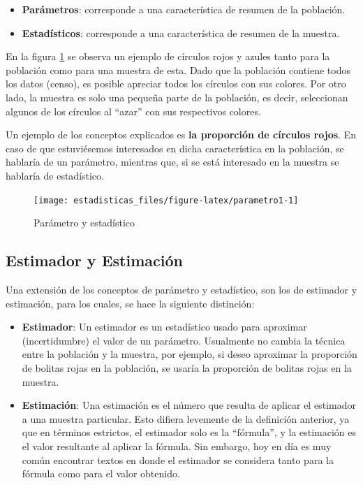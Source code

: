 \documentclass[
  11pt,
]{book}
\providecommand{\tightlist}{%
  \setlength{\itemsep}{0pt}\setlength{\parskip}{0pt}}
\theoremstyle{definition}
\theoremstyle{definition}
\theoremstyle{definition}
\theoremstyle{definition}
\theoremstyle{remark}
\begin{document}
\begin{itemize}
\tightlist
\item
  \textbf{Parámetros}: corresponde a una característica de resumen de la población.
\item
  \textbf{Estadísticos}: corresponde a una característica de resumen de la muestra.
\end{itemize}

En la figura \ref{fig:parametro1} se observa un ejemplo de círculos rojos y azules tanto para la población como para una muestra de esta. Dado que la población contiene todos los datos (censo), es posible apreciar todos los círculos con sus colores. Por otro lado, la muestra es solo una pequeña parte de la población, es decir, seleccionan algunos de los círculos al ``azar'' con sus respectivos colores.

Un ejemplo de los conceptos explicados es \textbf{la proporción de círculos rojos}. En caso de que estuviésemos interesados en dicha característica en la población, se hablaría de un parámetro, mientras que, si se está interesado en la muestra se hablaría de estadístico.

\begin{figure}

{\centering \texttt{[image: estadisticas\_files/figure-latex/parametro1-1]} 

}

\caption{Parámetro y estadístico}\label{fig:parametro1}
\end{figure}

\subsection{Estimador y Estimación}\label{estimador-y-estimaciuxf3n}

Una extensión de los conceptos de parámetro y estadístico, son los de estimador y estimación, para los cuales, se hace la siguiente distinción:

\begin{itemize}
\item
  \textbf{Estimador}: Un estimador es un estadístico usado para aproximar (incertidumbre) el valor de un parámetro. Usualmente no cambia la técnica entre la población y la muestra, por ejemplo, si deseo aproximar la proporción de bolitas rojas en la población, se usaría la proporción de bolitas rojas en la muestra.
\item
  \textbf{Estimación}: Una estimación es el número que resulta de aplicar el estimador a una muestra particular. Esto difiera levemente de la definición anterior, ya que en términos estrictos, el estimador solo es la ``fórmula'', y la estimación es el valor resultante al aplicar la fórmula. Sin embargo, hoy en día es muy común encontrar textos en donde el estimador se considera tanto para la fórmula como para el valor obtenido.
\end{itemize}
\end{document}
